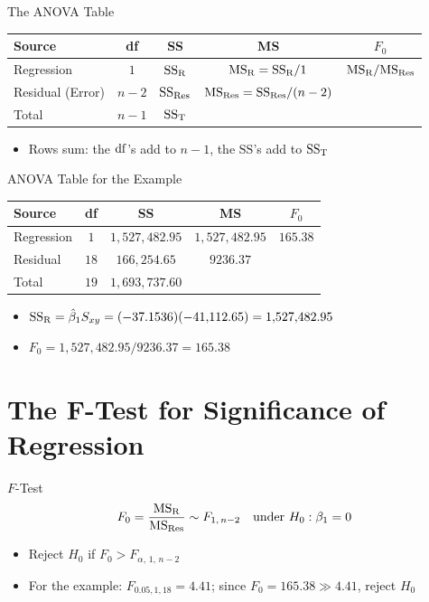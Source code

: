 \begin{frame}{The ANOVA Table}
	\begin{table}
		\small
		\centering
		\begin{tabular}{lcccc}
			\toprule
			Source & df & SS & MS & $F_0$\\
			\midrule
			Regression & $1$ & $\mathrm{SS}_{\mathrm{R}}$ & $\mathrm{MS}_{\mathrm{R}}=\mathrm{SS}_{\mathrm{R}}/1$ & $\mathrm{MS}_{\mathrm{R}}/\mathrm{MS}_{\mathrm{Res}}$\\
			Residual (Error) & $n-2$ & $\mathrm{SS}_{\mathrm{Res}}$ & $\mathrm{MS}_{\mathrm{Res}}=\mathrm{SS}_{\mathrm{Res}}/(n-2)$ & \\
			\midrule
			Total & $n-1$ & $\mathrm{SS}_{\mathrm{T}}$ & & \\
			\bottomrule
		\end{tabular}
	\end{table}
	\begin{itemize}
		\item Rows sum: the $\mathrm{df}$'s add to $n-1$, the $\mathrm{SS}$'s add to $\mathrm{SS}_{\mathrm{T}}$
	\end{itemize}
\end{frame}


\begin{frame}{ANOVA Table for the Example}
	\begin{table}
	\small
	\centering
	\begin{tabular}{lcccc}
		\toprule
		Source & df & SS & MS & $F_0$\\
		\midrule
		Regression & $1$ & $1{,}527{,}482.95$ & $1{,}527{,}482.95$ & $165.38$\\
		Residual & $18$ & $166{,}254.65$ & $9236.37$ & \\
		\midrule
		Total & $19$ & $1{,}693{,}737.60$ & & \\
		\bottomrule
		\end{tabular}
	\end{table}
	\begin{itemize}
		\item $\mathrm{SS}_{\mathrm{R}}=\hat\beta_1 S_{xy}=(-37.1536)(-41{,}112.65)=1{,}527{,}482.95$
		\item $F_0 = 1{,}527{,}482.95/9236.37 = 165.38$
	\end{itemize}
\end{frame}


\section{The F-Test for Significance of Regression}


\begin{frame}{$F$-Test}
	\[
		F_0 = \frac{\mathrm{MS}_{\mathrm{R}}}{\mathrm{MS}_{\mathrm{Res}}} \sim F_{1,\,n-2} \quad\text{under } H_0:\beta_1=0
	\]
	\begin{itemize}
	\item Reject $H_0$ if $F_0 > F_{\alpha,\,1,\,n-2}$
	\item For the example: $F_{0.05,1,18}=4.41$; since $F_0=165.38 \gg 4.41$, reject $H_0$
	\end{itemize}
\end{frame}


